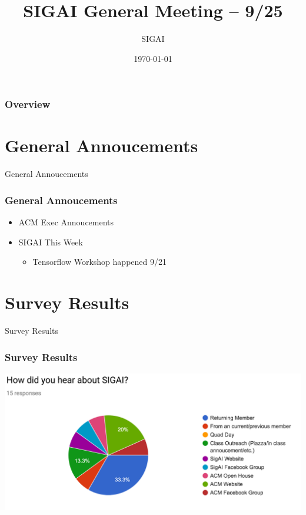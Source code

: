 \documentclass{beamer}
\title[9/25]{SIGAI General Meeting -- 9/25} %
\author{SIGAI} %
\institute[http://sigai.ml] %
{
  \textit{http://sigai.ml} %
}
\date{\today} %
\begin{document}
\begin{frame}
  \titlepage %
\end{frame}

\begin{frame}
  \frametitle{Overview} %
  \tableofcontents %
\end{frame}

\section{General Annoucements}
\begin{frame}
  \huge{\centerline{General Annoucements}}
\end{frame}
\begin{frame}
  \frametitle{General Annoucements}
  \begin{itemize}
  \item ACM Exec Annoucements
  \item SIGAI This Week
    \begin{itemize}
    \item Tensorflow Workshop happened 9/21
    \end{itemize}
  \end{itemize}
\end{frame}

\section{Survey Results}
\begin{frame}
  \huge{\centerline{Survey Results}}
\end{frame}
\begin{frame}
  \frametitle{Survey Results}
  \begin{center}
    \includegraphics[width=0.8\linewidth]{feedback1.png}
  \end{center}
\end{frame}
\end{document}
